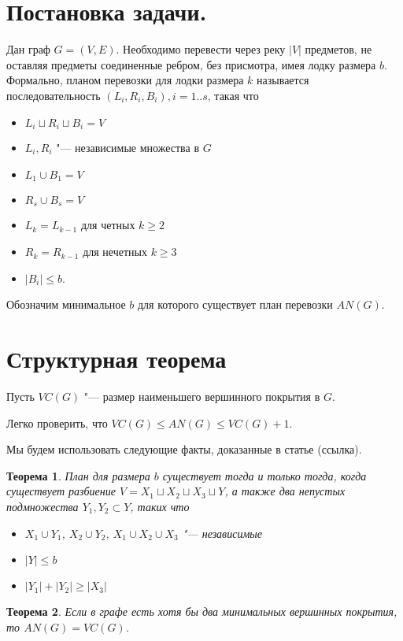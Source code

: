 \documentclass[10pt,a4paper]{article}
\newtheorem{thm}{Теорема}
\begin{document}
\raggedbottom

\section{Постановка задачи.}

Дан граф $G = (V, E)$. Необходимо перевести через реку 
$|V|$ предметов, не оставляя предметы соединенные ребром,
без присмотра, имея лодку размера $b$.
Формально, планом перевозки для лодки размера $k$ называется последовательность
$(L_{i}, R_{i}, B_{i}), i = 1..s$, такая что
\begin{itemize}
\item $L_i \sqcup R_i \sqcup B_i = V$
\item $L_i, R_i$ "--- независимые множества в $G$
\item $L_1 \cup B_1 = V$
\item $R_{s} \cup B_{s} = V$
\item $L_{k} = L_{k-1}$ для четных $k \ge 2$
\item $R_{k} = R_{k-1}$ для нечетных $k \ge 3$
\item $|B_i| \le b$.
\end{itemize}

Обозначим минимальное $b$ для которого существует план перевозки $AN(G)$.

\section{Структурная теорема}

Пусть $VC(G)$ "--- размер наименьшего вершинного покрытия в $G$.

Легко проверить, что $VC(G) \le AN(G) \le VC(G)+1$.

Мы будем использовать следующие факты, доказанные в статье (ссылка).

\begin{thm}
План для размера $b$ существует тогда и только тогда, 
когда существует разбиение $V = X_1 \sqcup X_2 \sqcup X_3 \sqcup Y$,
а также два непустых подмножества $Y_1, Y_2 \subset Y$, таких что
\begin{itemize}
\item $X_1 \cup Y_1$, $X_2 \cup Y_2$, $X_1 \cup X_2 \cup X_3$ "--- независимые
\item $|Y| \le b$
\item $|Y_1| + |Y_2| \ge |X_3|$
\end{itemize}
\end{thm}

\begin{thm}
Если в графе есть хотя бы два минимальных вершинных покрытия,
то $AN(G) = VC(G)$.
\end{thm}
\end{document}
